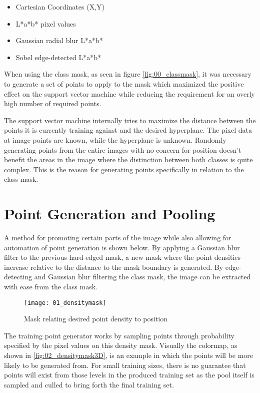 \begin{itemize}
    \item Cartesian Coordinates (X,Y)
    \item L*a*b* pixel values
    \item Gaussian radial blur L*a*b*
    \item Sobel edge-detected L*a*b*
\end{itemize}

When using the class mask, as seen in figure \ref{fig:00_classmask}, it was necessary to generate a set of points to apply to the mask which maximized the positive effect on the support vector machine while reducing the requirement for an overly high number of required points. 

The support vector machine internally tries to maximize the distance between the points it is currently training against and the desired hyperplane\citep{SH_hyperplane0}. The pixel data at image points are known, while the hyperplane is unknown. Randomly generating points from the entire images with no concern for position doesn't benefit the areas in the image where the distinction between both classes is quite complex. This is the reason for generating points specifically in relation to the class mask. 

\section{Point Generation and Pooling}

A method for promoting certain parts of the image while also allowing for automation of point generation is shown below. By applying a Gaussian blur filter to the previous hard-edged mask, a new mask where the point densities increase relative to the distance to the mask boundary is generated. By edge-detecting and Gaussian blur filtering the class mask, the image can be extracted with ease from the class mask.

\begin{figure}[h]
    \centering
    \texttt{[image: 01\_densitymask]}
    \caption{Mask relating desired point density to position}
    \label{fig:01_densitymask}
\end{figure}

The training point generator works by sampling points through probability specified by the pixel values on this density mask. Visually the colormap, as shown in \ref{fig:02_densitymask3D}, is an example in which the points will be more likely to be generated from. For small training sizes, there is no guarantee that points will exist from those levels in the produced training set as the pool itself is sampled and culled to bring forth the final training set.

